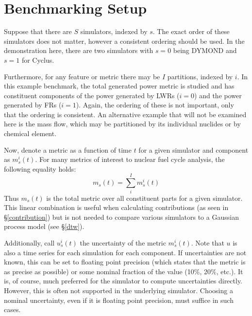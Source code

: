 \section{Benchmarking Setup}
\label{setup}

Suppose that there are $S$ simulators, indexed by $s$. The exact order 
of these simulators does not matter, however a consistent ordering should
be used. In the demonstration here, there are two simulators with $s=0$
being DYMOND and $s=1$ for Cyclus.

Furthermore, for any feature or metric there may be $I$ partitions, 
indexed by $i$. In this example benchmark, the total generated power metric
is studied and has constituent components of the power generated by LWRs 
($i=0$) and
the power generated by FRs ($i=1$).  Again, the ordering of these is not 
important, only that the ordering is consistent. An alternative example
that will not be examined here is the mass flow, which may be partitioned 
by its individual nuclides or by chemical element.

Now, denote a metric as a function of time $t$ for a given simulator and 
component as $m_s^i(t)$. For many metrics of interest 
to nuclear fuel cycle analysis, the following equality holds:
\begin{equation}
m_s(t) = \sum_i^I m_s^i(t)
\end{equation}
Thus $m_s(t)$ is the total metric over all constituent parts for a given 
simulator. This linear combination is useful when calculating contributions
(as seen in \S\ref{contribution}) but is not needed to compare various 
simulators to a Gaussian process model (see \S\ref{dtw}).

Additionally, call $u_s^i(t)$ the uncertainty of the metric 
$m_s^i(t)$. Note that $u$ is also a time series for each simulation for 
each component. If uncertainties are not known, this can be set to floating
point precision (which states that the metric is as precise as possible) or
some nominal fraction of the value (10\%, 20\%, etc.). It is, of course, 
much preferred for the simulator to compute 
uncertainties directly. However, this is often not supported in the underlying
simulator. Choosing a nominal uncertainty, even if it is floating point 
precision, must suffice in such cases.

